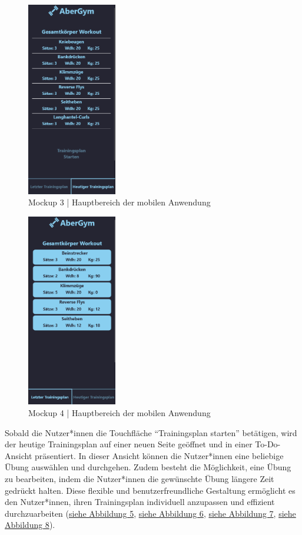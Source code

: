 \begin{figure}[!htb]
    \centering
    \includegraphics[width=0.35\textwidth]{pics/main3.png}
    \caption{Mockup 3 | Hauptbereich der mobilen Anwendung}
    \label{fig:main3}
\end{figure}
\begin{figure}[!htb]
    \centering
    \includegraphics[width=0.35\textwidth]{pics/main4.png}
    \caption{Mockup 4 | Hauptbereich der mobilen Anwendung}
    \label{fig:main4}
\end{figure}
\FloatBarrier

Sobald die Nutzer*innen die Touchfläche {``Trainingsplan starten''} betätigen, wird der heutige Trainingsplan auf einer neuen Seite geöffnet und in einer To-Do-Ansicht präsentiert. In dieser Ansicht können die Nutzer*innen eine beliebige Übung auswählen und durchgehen. Zudem besteht die Möglichkeit, eine Übung zu bearbeiten, indem die Nutzer*innen die gewünschte Übung längere Zeit gedrückt halten. Diese flexible und benutzerfreundliche Gestaltung ermöglicht es den Nutzer*innen, ihren Trainingsplan individuell anzupassen und effizient durchzuarbeiten (\hyperref[fig:todolist1]{siehe Abbildung 5}, \hyperref[fig:todolist2]{siehe Abbildung 6}, \hyperref[fig:todolist3]{siehe Abbildung 7}, \hyperref[fig:todolist4]{siehe Abbildung 8}).


